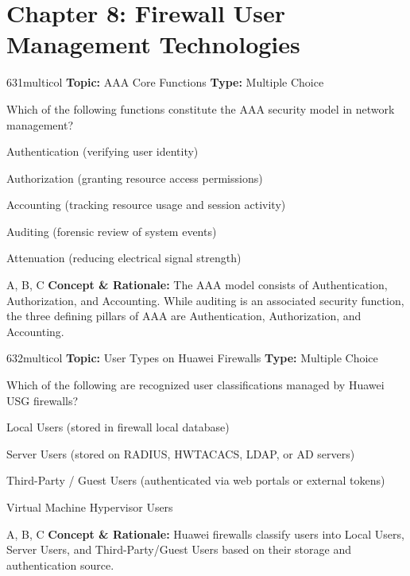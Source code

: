 \section{Chapter 8: Firewall User Management Technologies}

\begin{qcard}{631}{multicol}
\textcolor{darkslate!75}{\small\textbf{Topic:} AAA Core Functions \hfill \textbf{Type:} Multiple Choice}\vspace{0.4em}\par
Which of the following functions constitute the AAA security model in network management?
\begin{qoptions}
\item Authentication (verifying user identity)
\item Authorization (granting resource access permissions)
\item Accounting (tracking resource usage and session activity)
\item Auditing (forensic review of system events)
\item Attenuation (reducing electrical signal strength)
\end{qoptions}
\end{qcard}
\nopagebreak
\begin{explainbox}{A, B, C}
\textbf{Concept \& Rationale:} The AAA model consists of Authentication, Authorization, and Accounting. While auditing is an associated security function, the three defining pillars of AAA are Authentication, Authorization, and Accounting.
\end{explainbox}

\begin{qcard}{632}{multicol}
\textcolor{darkslate!75}{\small\textbf{Topic:} User Types on Huawei Firewalls \hfill \textbf{Type:} Multiple Choice}\vspace{0.4em}\par
Which of the following are recognized user classifications managed by Huawei USG firewalls?
\begin{qoptions}
\item Local Users (stored in firewall local database)
\item Server Users (stored on RADIUS, HWTACACS, LDAP, or AD servers)
\item Third-Party / Guest Users (authenticated via web portals or external tokens)
\item Virtual Machine Hypervisor Users
\end{qoptions}
\end{qcard}
\nopagebreak
\begin{explainbox}{A, B, C}
\textbf{Concept \& Rationale:} Huawei firewalls classify users into Local Users, Server Users, and Third-Party/Guest Users based on their storage and authentication source.
\end{explainbox}

